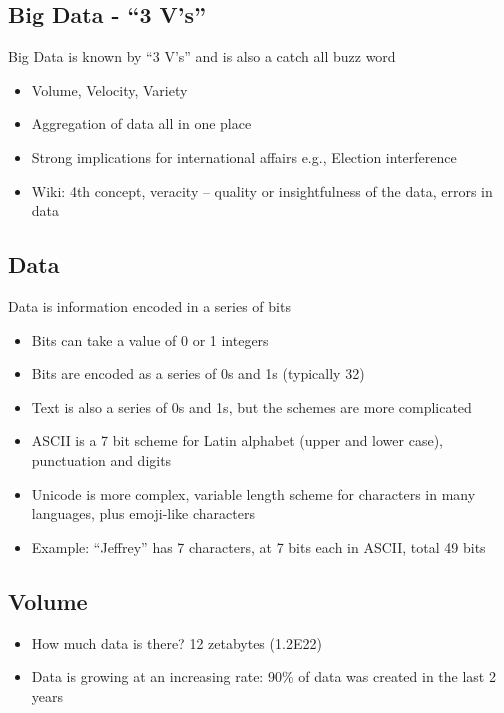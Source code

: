 \documentclass[
]{book}
\providecommand{\tightlist}{%
  \setlength{\itemsep}{0pt}\setlength{\parskip}{0pt}}
\begin{document}
\subsection{Big Data - ``3 V's''}\label{big-data---3-vs}

Big Data is known by ``3 V's'' and is also a catch all buzz word

\begin{itemize}
\tightlist
\item
  Volume, Velocity, Variety
\item
  Aggregation of data all in one place
\item
  Strong implications for international affairs e.g., Election interference
\item
  Wiki: 4th concept, veracity -- quality or insightfulness of the data, errors in data
\end{itemize}

\subsection{Data}\label{data}

Data is information encoded in a series of bits

\begin{itemize}
\tightlist
\item
  Bits can take a value of 0 or 1 integers
\item
  Bits are encoded as a series of 0s and 1s (typically 32)
\item
  Text is also a series of 0s and 1s, but the schemes are more complicated
\item
  ASCII is a 7 bit scheme for Latin alphabet (upper and lower case), punctuation and digits
\item
  Unicode is more complex, variable length scheme for characters in many languages, plus emoji-like characters
\item
  Example: ``Jeffrey'' has 7 characters, at 7 bits each in ASCII, total 49 bits
\end{itemize}

\subsection{Volume}\label{volume}

\begin{itemize}
\tightlist
\item
  How much data is there? 12 zetabytes (1.2E22)
\item
  Data is growing at an increasing rate: 90\% of data was created in the last 2 years
\end{itemize}
\end{document}
